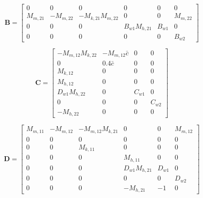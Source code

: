 \documentclass{scrreprt}
\begin{document}
\[
\boldsymbol{B} =
\begin{bmatrix}
0 & 0 & 0 & 0 & 0 & 0 \\
M_{m,21} & -M_{m,22} & -M_{k,21}M_{m,22} & 0 & 0 & M_{m,22} \\
0 & 0 & 0 & B_{w1}M_{h,21} & B_{w1} & 0 \\
0 & 0 & 0 & 0 & 0 & B_{w2}
\end{bmatrix}
\]

\[
\boldsymbol{C} =
\begin{bmatrix}
-M_{m,12}M_{k,22} & -M_{m,12}\bar{c} & 0 & 0 \\
0 & 0.4\bar{c} & 0 & 0 \\
M_{k,12} & 0 & 0 & 0 \\
M_{h,12} & 0 & 0 & 0 \\
D_{w1}M_{h,22} & 0 & C_{w1} & 0 \\
0 & 0 & 0 & C_{w2} \\
-M_{h,22} & 0 & 0 & 0
\end{bmatrix}
\]

\[
\boldsymbol{D} =
\begin{bmatrix}
M_{m,11} & -M_{m,12} & -M_{m,12}M_{k,21} & 0 & 0 & M_{m,12} \\
0 & 0 & 0 & 0 & 0 & 0 \\
0 & 0 & M_{k,11} & 0 & 0 & 0 \\
0 & 0 & 0 & M_{h,11} & 0 & 0 \\
0 & 0 & 0 & D_{w1}M_{h,21} & D_{w1} & 0 \\
0 & 0 & 0 & 0 & 0 & D_{w2} \\
0 & 0 & 0 & -M_{h,21} & -1 & 0
\end{bmatrix}
\]
\end{document}
